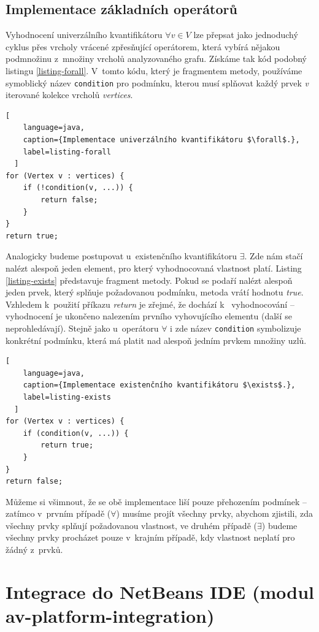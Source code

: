 \subsection{Implementace základních operátorů}
Vyhodnocení univerzálního kvantifikátoru $\forall v \in V$ lze přepsat jako jednoduchý cyklus přes vrcholy vrácené zpřesňující operátorem, která vybírá nějakou podmnožinu z~množiny vrcholů analyzovaného grafu. Získáme tak kód podobný listingu \ref{listing-forall}. V~tomto kódu, který je fragmentem metody, používáme symoblický název \verb+condition+ pro podmínku, kterou musí splňovat každý prvek \emph{v} iterované kolekce vrcholů \emph{vertices}.

\begin{lstlisting}[
    language=java,
    caption={Implementace univerzálního kvantifikátoru $\forall$.},
    label=listing-forall
  ]
for (Vertex v : vertices) {
    if (!condition(v, ...)) {
        return false;
    }
}
return true;
\end{lstlisting}

Analogicky budeme postupovat u~existenčního kvantifikátoru $\exists$. Zde nám stačí nalézt alespoň jeden element, pro který vyhodnocovaná vlastnost platí. Listing \ref{listing-exists} představuje fragment metody. Pokud se podaří nalézt alespoň jeden prvek, který splňuje požadovanou podmínku, metoda vrátí hodnotu \emph{true}. Vzhledem k~použití příkazu \emph{return} je zřejmé, že dochází k~ vyhodnocování -- vyhodnocení je ukončeno nalezením prvního vyhovujícího elementu (další se neprohledávají). Stejně jako u~operátoru $\forall$ i zde název \verb+condition+ symbolizuje konkrétní podmínku, která má platit nad alespoň jedním prvkem množiny uzlů.

\begin{lstlisting}[
    language=java,
    caption={Implementace existenčního kvantifikátoru $\exists$.},
    label=listing-exists
  ]
for (Vertex v : vertices) {
    if (condition(v, ...)) {
        return true;
    }
}
return false;
\end{lstlisting}

Můžeme si všimnout, že se obě implementace liší pouze přehozením podmínek -- zatímco v~prvním případě ($\forall$) musíme projít všechny prvky, abychom zjistili, zda všechny prvky splňují požadovanou vlastnost, ve druhém případě ($\exists$) budeme všechny prvky procházet pouze v~krajním případě, kdy vlastnost neplatí pro žádný z~prvků.

\section{Integrace do NetBeans IDE (modul av-platform-integration)}

